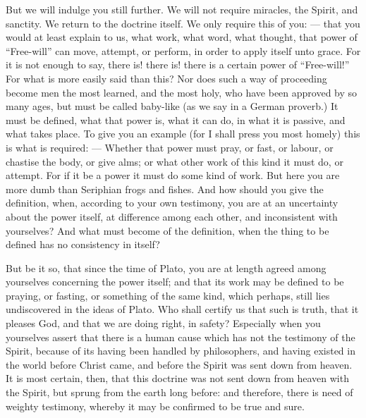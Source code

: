 But we will indulge you still further. We will not require miracles, the Spirit, and sanctity. We return to the doctrine itself. We only require this of you: — that you would at least explain to us, what work, what word, what thought, that power of “Free-will” can move, attempt, or perform, in order to apply itself unto grace. For it is not enough to say, there is! there is! there is a certain power of “Free-will!” For what is more easily said than this? Nor does such a way of proceeding become men the most learned, and the most holy, who have been approved by so many ages, but must be called baby-like (as we say in a German proverb.) It must be defined, what that power is, what it can do, in what it is passive, and what takes place. To give you an example (for I shall press you most homely) this is what is required: — Whether that power must pray, or fast, or labour, or chastise the body, or give alms; or what other work of this kind it must do, or attempt. For if it be a power it must do some kind of work. But here you are more dumb than Seriphian frogs and fishes. And how should you give the definition, when, according to your own testimony, you are at an uncertainty about the power itself, at difference among each other, and inconsistent with yourselves? And what must become of the definition, when the thing to be defined has no consistency in itself?

But be it so, that since the time of Plato, you are at length agreed among yourselves concerning the power itself; and that its work may be defined to be praying, or fasting, or something of the same kind, which perhaps, still lies undiscovered in the ideas of Plato. Who shall certify us that such is truth, that it pleases God, and that we are doing right, in safety? Especially when you yourselves assert that there is a human cause which has not the testimony of the Spirit, because of its having been handled by philosophers, and having existed in the world before Christ came, and before the Spirit was sent down from heaven. It is most certain, then, that this doctrine was not sent down from heaven with the Spirit, but sprung from the earth long before: and therefore, there is need of weighty testimony, whereby it may be confirmed to be true and sure.

